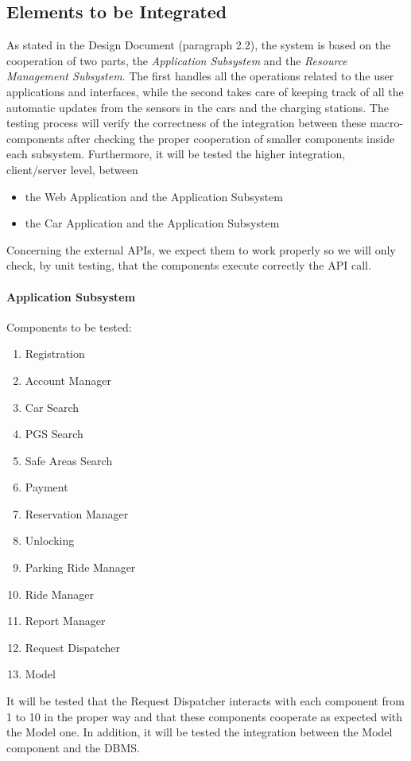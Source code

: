 \documentclass[english]{article}
\begin{document}
\subsection{Elements to be Integrated}

As stated in the Design Document (paragraph 2.2), the system is based on the cooperation of two parts, the \emph{Application Subsystem}  and the \emph{Resource Management Subsystem}. The first handles all the operations related to the user applications and interfaces, while the second takes care of keeping track of all the automatic updates from the sensors in the cars and the charging stations.
The testing process will verify the correctness of the integration between these macro-components after checking the proper cooperation of smaller components inside each subsystem.
Furthermore, it will be tested the higher integration, client/server level, between
\begin{itemize}
\item the Web Application and the Application Subsystem
\item the Car Application and the Application Subsystem
\end{itemize}
Concerning the external APIs, we expect them to work properly so we will only check, by unit testing, that the components execute correctly the API call.


\paragraph{Application Subsystem}
Components to be tested:
\begin{enumerate}
\item Registration
\item Account Manager
\item Car Search
\item PGS Search
\item Safe Areas Search
\item Payment
\item Reservation Manager
\item Unlocking
\item Parking Ride Manager
\item Ride Manager
\item Report Manager
\item Request Dispatcher
\item Model
\end{enumerate}

It will be tested that the Request Dispatcher interacts with each component from 1 to 10 in the proper way and that these components cooperate as expected with the Model one. In addition, it will be tested the integration between the Model component and the DBMS.
\end{document}

